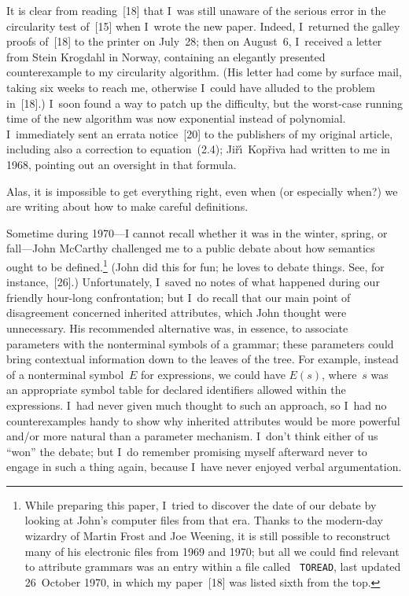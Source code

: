 \vfill


\eject

It is clear from reading~[18]
that I~was still unaware of the serious error in the circularity test
of~[15]
when I~wrote the new paper. Indeed, I~returned the galley proofs 
of~[18]
to the printer on July~28; then on August~6, I~received a letter from
Stein Krogdahl in Norway, containing an elegantly presented
counterexample to my circularity algorithm. (His letter had come by
surface mail, taking six weeks to reach me, otherwise I~could have
alluded to the problem in~[18].)
I~soon found a way to patch up the difficulty, but the worst-case
running time of the new algorithm was now exponential instead of
polynomial. I~immediately sent an errata notice~[20]
to the publishers of my original article, including also a correction to
equation~(2.4); Ji{\v r}\'{\i}\ Kop{\v r}iva had written to me in
1968, pointing out an oversight in that formula. 

Alas, it is impossible to get everything right, even when (or
especially when?) we are writing about how to make careful
definitions.

Sometime during 1970---I cannot recall whether it was in the winter,
spring, or fall---John McCarthy challenged me to a public debate about
how semantics ought to be defined.\footnote*{While preparing this
paper, I~tried to discover the date of our debate by looking at John's
computer files from that  era. Thanks to the modern-day wizardry of
Martin Frost and Joe Weening, it is still possible to reconstruct many
of his electronic files from 1969 and 1970; but all we could find
relevant to attribute grammars was an entry within a file called {\tt
TOREAD}, last updated 26~October 1970, in which my paper~[18]
was listed sixth from the top.}
(John did this for fun; he loves to
debate things. See, for instance,~[26].)
Unfortunately, I~saved no notes of what happened during our friendly
hour-long confrontation; but I~do recall that our main point of
disagreement concerned inherited attributes, which John thought were
unnecessary. His recommended alternative was, in essence, to associate
parameters with the nonterminal symbols of a grammar; these parameters
could bring contextual information down to the leaves of the tree.
For example, instead of a nonterminal symbol~$E$ for expressions, we
could have $E(s)$, where~$s$ was an appropriate symbol table for
declared identifiers allowed within the expressions.
I~had never given much thought to such an approach, so I~had no
counterexamples handy to show why inherited attributes would be more
powerful and/or more natural than a parameter mechanism. I~don't think
either of us ``won'' the debate; but I~do remember promising myself
afterward never to engage in such a thing again, because I~have never
enjoyed verbal argumentation.

